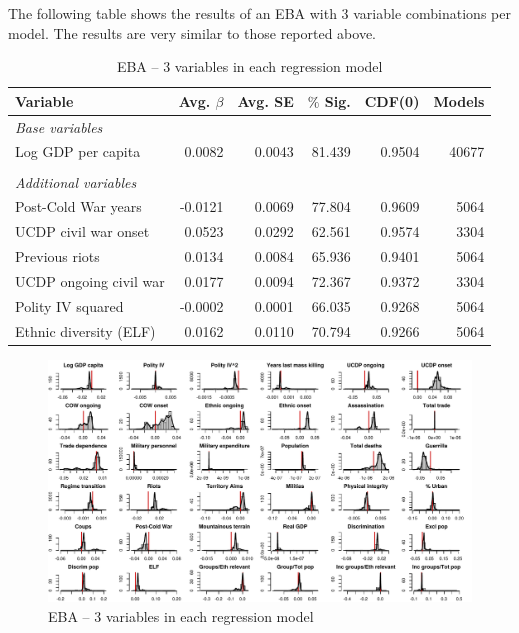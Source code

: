 The following table shows the results of an EBA with 3 variable combinations per model. The results are very similar to those reported above.

\vspace{1cm}

\begin{table}[H]
\centering
\begin{tabular}{lrrrrr}
\hline
\textbf{Variable} & \textbf{Avg. $\beta$} & \textbf{Avg. SE} & \textbf{$\%$ Sig.} & \textbf{CDF(0)} & \textbf{Models} \\ \hline
\textit{Base variables} &  &  &  &  &  \\
Log GDP per capita & 0.0082 & 0.0043 & 81.439 & 0.9504 & 40677 \\
 &  &  &  &  &  \\
\textit{Additional variables} &  &  &  &  &  \\
Post-Cold War years & -0.0121 & 0.0069 & 77.804 & 0.9609 & 5064 \\
UCDP civil war onset & 0.0523 & 0.0292 & 62.561 & 0.9574 & 3304 \\
Previous riots &0.0134 & 0.0084 & 65.936 & 0.9401 & 5064 \\
UCDP ongoing civil war & 0.0177 & 0.0094 & 72.367 & 0.9372 & 3304 \\
Polity IV squared & -0.0002 & 0.0001 & 66.035 & 0.9268 & 5064 \\ 
Ethnic diversity (ELF) & 0.0162 & 0.0110 & 70.794 & 0.9266 & 5064 \\\hline
\end{tabular}
\caption{EBA -- 3 variables in each regression model}
\label{tab:mk-3vars}
\end{table}

\clearpage
\begin{figure}
    \centering
    \includegraphics[width=\textwidth]{images/mk-3vars.pdf}
    \caption{EBA -- 3 variables in each regression model}
    \label{fig:mk-3vars}
\end{figure}
\clearpage

